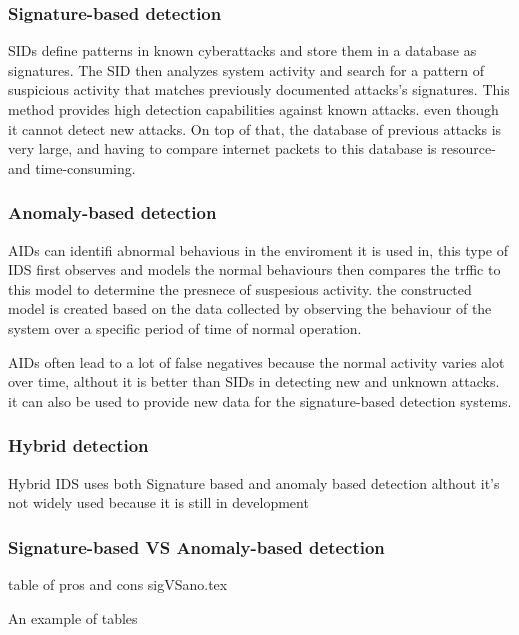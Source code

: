 \subsubsection{Signature-based detection}
SIDs define patterns in known cyberattacks and store them in a database as signatures. The SID then analyzes system activity and search for a pattern of suspicious activity that matches previously documented attacks's signatures. This method provides high detection capabilities against known attacks. even though it cannot detect new attacks. On top of that, the database of previous attacks is very large, and having to compare internet packets to this database is resource- and time-consuming. \cite{NIST-IDS}



\subsubsection{Anomaly-based detection}
AIDs can identifi abnormal behavious in the enviroment it is used in, this type of IDS first observes and models the normal behaviours then compares the trffic to this model to determine the presnece of suspesious activity. the constructed model is created based on the data collected by observing the behaviour of the system over a specific period of time of normal operation. \cite{NIST-IDS}

AIDs often lead to a lot of false negatives because the normal activity varies alot over time, althout it is better than SIDs in detecting new and unknown attacks. it can also be used to provide new data for the signature-based detection systems. \cite{NIST-IDS}




\subsubsection{Hybrid detection}
Hybrid IDS uses both Signature based and anomaly based detection althout it's not widely used because it is still in development
\clearpage

\subsubsection{Signature-based VS Anomaly-based detection}
table of pros and cons
sigVSano.tex
\begin{table}[h]
	\centering
	\caption{An example of tables}
	
	\label{tab:example}
\end{table}



